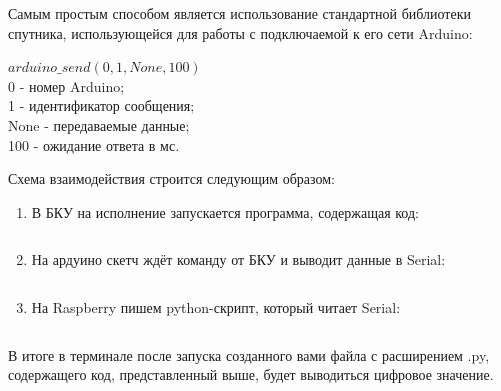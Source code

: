 Самым простым способом является использование стандартной библиотеки спутника, использующейся для работы с подключаемой к его сети Arduino:

$arduino\_send(0, 1, None, 100)$\\
0 - номер Arduino;\\
1 - идентификатор сообщения;\\
None - передаваемые данные;\\
100 - ожидание ответа в мс.

Схема взаимодействия строится следующим образом:

\begin{enumerate}
    \item В БКУ на исполнение запускается программа, содержащая код:
    \inputminted[fontsize=\footnotesize, linenos]{python}{final/command_tour/dzz/task_02/source_5.py}
    \item На ардуино скетч ждёт команду от БКУ и выводит данные в Serial:
    \inputminted[fontsize=\footnotesize, linenos]{cpp}{final/command_tour/dzz/task_02/source_6.cpp}
    \item На Raspberry пишем python-скрипт, который читает Serial:
    \inputminted[fontsize=\footnotesize, linenos]{python}{final/command_tour/dzz/task_02/source_7.py}
\end{enumerate}

В итоге в терминале после запуска созданного вами файла с расширением .py, содержащего код, представленный выше, будет выводиться цифровое значение.